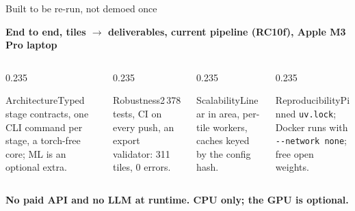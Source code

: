 \begin{frame}{Built to be re-run, not demoed once}\relax
  {\scriptsize\bfseries\color{sxNight} End to end, tiles $\rightarrow$ deliverables, current pipeline (RC10f), Apple M3 Pro laptop\par}
  \vspace{2mm}
  \vspace{4mm}

  \begin{columns}[T]
    \begin{column}{0.235\textwidth}\begin{sxcard}{Architecture}Typed stage contracts, one CLI command per stage, a torch-free core; ML is an optional extra.\end{sxcard}\end{column}
    \begin{column}{0.235\textwidth}\begin{sxcard}{Robustness}2\,378 tests, CI on every push, an export validator: 311 tiles, 0 errors.\end{sxcard}\end{column}
    \begin{column}{0.235\textwidth}\begin{sxcard}{Scalability}Linear in area, per-tile workers, caches keyed by the config hash.\end{sxcard}\end{column}
    \begin{column}{0.235\textwidth}\begin{sxcard}{Reproducibility}Pinned \texttt{uv.lock}; Docker runs with \texttt{-{}-network none}; free open weights.\end{sxcard}\end{column}
  \end{columns}
  \vspace{3mm}
  {\color{sxIndigo}\footnotesize\bfseries No paid API and no LLM at runtime. CPU only; the GPU is optional.\par}
\end{frame}
